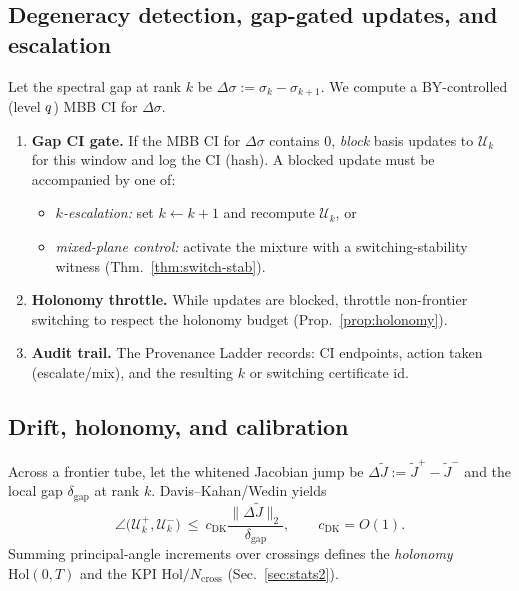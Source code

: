 \subsection*{Degeneracy detection, gap-gated updates, and escalation}
Let the spectral gap at rank $k$ be $\Delta\sigma:=\sigma_k-\sigma_{k+1}$.
We compute a BY-controlled (level $q$) MBB CI for $\Delta\sigma$.

\begin{lemma}\label{lem:deg}
\emph{}
\begin{enumerate}[leftmargin=*,itemsep=2pt]
\item \textbf{Gap CI gate.} If the MBB CI for $\Delta\sigma$ contains $0$, \emph{block} basis updates to $\mathcal U_k$ for this window and log the CI (hash). A blocked update must be accompanied by one of:
\begin{itemize}[leftmargin=10pt]
\item \emph{$k$-escalation:} set $k\leftarrow k{+}1$ and recompute $\mathcal U_k$, or
\item \emph{mixed-plane control:} activate the mixture with a switching-stability witness (Thm.~\ref{thm:switch-stab}).
\end{itemize}
\item \textbf{Holonomy throttle.} While updates are blocked, throttle non-frontier switching to respect the holonomy budget (Prop.~\ref{prop:holonomy}).
\item \textbf{Audit trail.} The Provenance Ladder records: CI endpoints, action taken (escalate/mix), and the resulting $k$ or switching certificate id.
\end{enumerate}
\end{lemma}

\subsection*{Drift, holonomy, and calibration}
Across a frontier tube, let the whitened Jacobian jump be $\Delta \widetilde J:=\widetilde J^{+}-\widetilde J^{-}$ and the local gap $\delta_{\mathrm{gap}}$ at rank $k$.
Davis–Kahan/Wedin yields
\[
\angle\!\big(\mathcal U_k^+,\mathcal U_k^-\big)
\ \le\
c_{\mathrm{DK}}\frac{\|\Delta \widetilde J\|_2}{\delta_{\mathrm{gap}}},
\qquad c_{\mathrm{DK}}=O(1).
\]
Summing principal-angle increments over crossings defines the \emph{holonomy} $\mathrm{Hol}(0,T)$ and the KPI $\mathrm{Hol}/N_{\mathrm{cross}}$ (Sec.~\ref{sec:stats2}).

